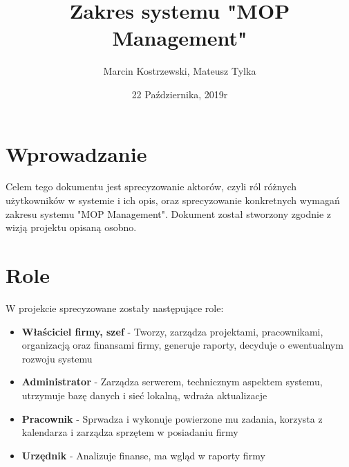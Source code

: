 \documentclass{article}
\title{Zakres systemu "MOP Management"}
\author{Marcin Kostrzewski, Mateusz Tylka}
\date{22 Października, 2019r}
\begin{document}
\maketitle
\newpage
\tableofcontents
\newpage

\section{Wprowadzanie}
Celem tego dokumentu jest sprecyzowanie aktorów, czyli ról różnych
użytkowników w systemie i ich opis, oraz sprecyzowanie konkretnych 
wymagań zakresu systemu "MOP Management". Dokument został stworzony
zgodnie z wizją projektu opisaną osobno.

\section{Role}
W projekcie sprecyzowane zostały następujące role:
\begin{itemize}
    \item \textbf{Właściciel firmy, szef} - Tworzy, zarządza projektami, pracownikami, organizacją oraz finansami firmy, generuje raporty, decyduje o ewentualnym rozwoju systemu
    \item \textbf{Administrator} - Zarządza serwerem, technicznym aspektem systemu, utrzymuje bazę danych i sieć lokalną, wdraża aktualizacje
    \item \textbf{Pracownik} - Sprwadza i wykonuje powierzone mu zadania, korzysta z kalendarza i zarządza sprzętem w posiadaniu firmy
    \item \textbf{Urzędnik} - Analizuje finanse, ma wgląd w raporty firmy
\end{itemize}
\end{document}
